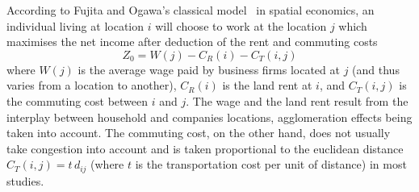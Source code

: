 According to Fujita and Ogawa's classical model~\cite{Fujita:1982} in
spatial economics, an individual living at location $i$ will choose to
work at the location $j$ which maximises the net income after
deduction of the rent and commuting costs~\cite{Fujita:1982}
%
\begin{equation}
Z_0=W(j)-C_R(i)-C_T(i,j)
\end{equation} 
%
where $W(j)$ is the average wage paid by business firms located at $j$
(and thus varies from a location to another), $C_R(i)$ is the land
rent at $i$, and $C_T(i,j)$ is the commuting cost between $i$ and
$j$. The wage and the land rent result from the interplay between
household and companies locations, agglomeration effects being taken
into account. The commuting cost, on the other hand, does not usually take congestion 
into account and is taken proportional to the euclidean distance
$C_T(i,j) = t\, d_{ij}$ (where $t$ is the transportation cost per unit
of distance) in most studies.

